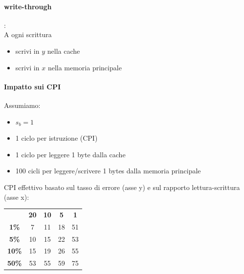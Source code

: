 \documentclass[12pt,a4paper]{article}
\begin{document}
\paragraph{write-through}:\\
A ogni scrittura
\begin{itemize}
\item scrivi in $y$ nella cache
\item scrivi in $x$ nella memoria principale
\end{itemize}

\SmallSep
\begin{center}
\end{center}

\paragraph{Impatto sui CPI}
Assumiamo:
\begin{itemize}
\item $s_b =1$
\item 1 ciclo per istruzione (CPI)
\item 1 ciclo per leggere 1 byte dalla cache
\item 100 cicli per leggere/scrivere 1 bytes dalla memoria principale
\end{itemize}
CPI effettivo basato sul tasso di errore (asse y) e sul rapporto lettura-scrittura (asse x):
\begin{center}
\begin{tabular}{ccccc}
 & \textbf{20} & \textbf{10} & \textbf{5} & \textbf{1} \\
\textbf{1\%} & 7 & 11 & 18 & 51 \\
\textbf{5\%} & 10 & 15 & 22 & 53 \\
\textbf{10\%} & 15 & 19 & 26 & 55 \\
\textbf{50\%} & 53 & 55 & 59 & 75
\end{tabular}
\end{center}
\end{document}

